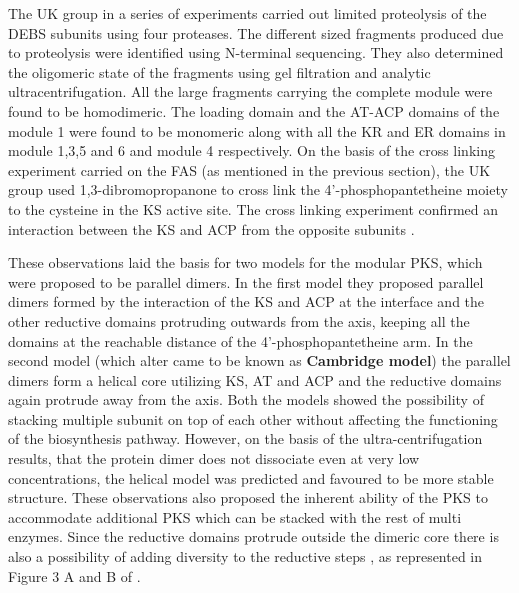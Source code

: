  			The UK group in a series of experiments carried out limited proteolysis of the DEBS subunits using four proteases. The different sized fragments produced due to proteolysis were identified using N-terminal sequencing. They also determined the oligomeric state of the fragments using gel filtration and analytic ultracentrifugation. All the large fragments carrying the complete module were found to be homodimeric. The loading domain and the AT-ACP domains of the module 1 were found to be monomeric along with all the KR and ER domains in module 1,3,5 and 6 and module 4 respectively. On the basis of the cross linking experiment carried on the FAS (as mentioned in the previous section), the UK group used 1,3-dibromopropanone to cross link the 4'-phosphopantetheine moiety to the cysteine in the KS active site. The cross linking experiment confirmed an interaction between the KS and ACP from the opposite subunits \parencite{Aparicio1994, Staunton1996}.  
 			
 			These observations laid the basis for two models for the modular PKS, which were proposed to be parallel dimers. In the first model they proposed parallel dimers formed by the interaction of the KS and ACP at the interface and the other reductive domains protruding outwards from the axis, keeping all the domains at the reachable distance of the 4'-phosphopantetheine arm. In the second model (which alter came to be known as \textbf{Cambridge model}) the parallel dimers form a helical core utilizing KS, AT and ACP and the reductive domains again protrude away from the axis. Both the models showed the possibility of stacking multiple subunit on top of each other without affecting the functioning of the biosynthesis pathway. However, on the basis of the ultra-centrifugation results, that the protein dimer does not dissociate even at very low concentrations, the helical model was predicted and favoured to be more stable structure. These observations also proposed the inherent ability of the PKS to accommodate additional PKS which can be stacked with the rest of multi enzymes. Since the reductive domains protrude outside the dimeric core there is also a possibility of adding diversity to the reductive steps \parencite{Aparicio1994,Staunton1996}, as represented in Figure 3 A and B of \textcite{Staunton1996}.
 			
